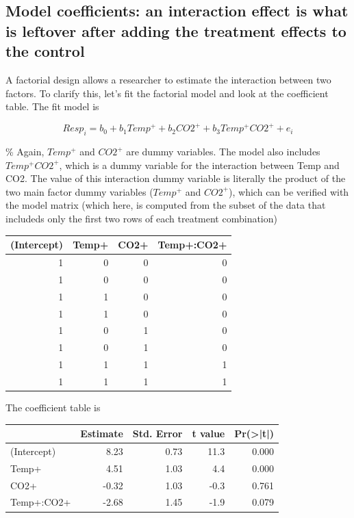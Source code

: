 \documentclass[]{book}
\begin{document}
\subsection{Model coefficients: an interaction effect is what is
leftover after adding the treatment effects to the
control}\label{model-coefficients-an-interaction-effect-is-what-is-leftover-after-adding-the-treatment-effects-to-the-control}

A factorial design allows a researcher to estimate the interaction
between two factors. To clarify this, let's fit the factorial model and
look at the coefficient table. The fit model is

\begin{equation}
Resp_i = b_0 + b_1 Temp^+ + b_2 CO2^+ + b_3 Temp^+ CO2^+ + e_i
\end{equation}

\% Again, \(Temp^+\) and \(CO2^+\) are dummy variables. The model also
includes \(Temp^+ CO2^+\), which is a dummy variable for the interaction
between Temp and CO2. The value of this interaction dummy variable is
literally the product of the two main factor dummy variables (\(Temp^+\)
and \(CO2^+\)), which can be verified with the model matrix (which here,
is computed from the subset of the data that includeds only the first
two rows of each treatment combination)

\begin{tabular}{r|r|r|r}
\hline
(Intercept) & Temp+ & CO2+ & Temp+:CO2+\\
\hline
1 & 0 & 0 & 0\\
\hline
1 & 0 & 0 & 0\\
\hline
1 & 1 & 0 & 0\\
\hline
1 & 1 & 0 & 0\\
\hline
1 & 0 & 1 & 0\\
\hline
1 & 0 & 1 & 0\\
\hline
1 & 1 & 1 & 1\\
\hline
1 & 1 & 1 & 1\\
\hline
\end{tabular}

The coefficient table is

\begin{tabular}{l|r|r|r|r}
\hline
  & Estimate & Std. Error & t value & Pr(>|t|)\\
\hline
(Intercept) & 8.23 & 0.73 & 11.3 & 0.000\\
\hline
Temp+ & 4.51 & 1.03 & 4.4 & 0.000\\
\hline
CO2+ & -0.32 & 1.03 & -0.3 & 0.761\\
\hline
Temp+:CO2+ & -2.68 & 1.45 & -1.9 & 0.079\\
\hline
\end{tabular}
\end{document}

